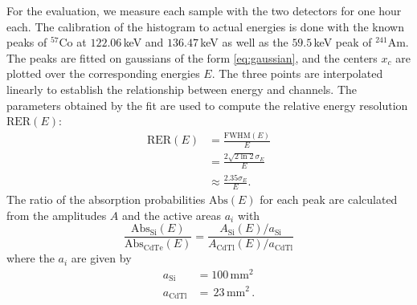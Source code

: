 For the evaluation, we measure each sample with the two detectors for 
one hour each. The calibration of the histogram to actual energies is 
done with the known peaks of $^{57}$Co at $122.06\,$keV and $136.47\,$keV 
as well as the $59.5\,$keV peak of $^{241}$Am. The peaks are fitted on 
gaussians of the form \eqref{eq:gaussian}, and the centers $x_c$ are 
plotted over the corresponding energies $E$. The three points 
are interpolated linearly to establish the relationship between energy and channels.  
The parameters obtained by the fit are used to compute 
the relative energy resolution $\mathrm{RER}(E)$:
\begin{equation}
    \begin{split}
        \mathrm{RER}(E) &= \frac{\mathrm{FWHM}(E)}{E} \\
                        &= \frac{2 \sqrt{2 \ln 2} \sigma_E}{E} \\
                        &\approx \frac{2.35 \sigma_E}{E} .
    \end{split}    
\end{equation}
The ratio of the absorption probabilities $\mathrm{Abs}(E)$ for each peak 
are calculated from the amplitudes $A$ and the active areas $a_i$ with 
\begin{equation}
    \frac{\mathrm{Abs_{Si}}(E)}{\mathrm{Abs_{CdTe}}(E)}
        = \frac{A_\mathrm{Si}(E) / a_\mathrm{Si}}{A_\mathrm{CdTl}(E) / a_\mathrm{CdTl}}
\end{equation}
where the $a_i$ are given by
\begin{align}
    a_\mathrm{Si}   &= 100 \, \mathrm{mm^2} \\
    a_\mathrm{CdTl} &= \,23 \, \mathrm{mm^2} \, .
\end{align}
